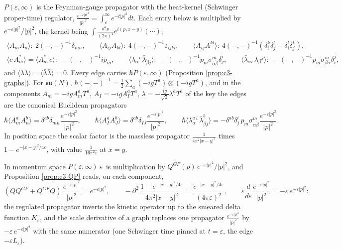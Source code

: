 \begin{remark}
$P(\varepsilon,\infty)$ is the Feynman-gauge propagator with the heat-kernel (Schwinger proper-time) regulator, $\frac{e^{-\varepsilon|p|^2}}{|p|^2}=\int_\varepsilon^\infty e^{-t|p|^2}dt$. Each entry below is multiplied by $e^{-\varepsilon|p|^2}/|p|^2$, the kernel being $\int\frac{d^4p}{(2\pi)^4}e^{i(p,x-y)}(\cdots)$:
\[
\begin{gathered}
\langle A_mA_n\rangle:\ 2(-,-)^{-1}\delta_{mn},\qquad \langle A_{ij}A_{kl}\rangle:\ 4(-,-)^{-1}\varepsilon_{ijkl},\qquad \langle A_{ij}A^{kl}\rangle:\ 4(-,-)^{-1}(\delta_i^k\delta_j^l-\delta_i^l\delta_j^k),\\
\langle c\,A^*_m\rangle=\langle A^*_m\,c\rangle:\ -(-,-)^{-1}ip_m,\qquad \langle\lambda_\alpha{}^i\,\bar\lambda_{\dot\beta j}\rangle:\ -(-,-)^{-1}p_m\sigma^m_{\alpha\dot\beta}\delta^i_j,\qquad \langle\bar\lambda_{\dot\alpha i}\,\lambda_\beta{}^j\rangle:\ -(-,-)^{-1}p_m\sigma^m_{\beta\dot\alpha}\delta_i^j,
\end{gathered}
\]
and $\langle\lambda\lambda\rangle=\langle\bar\lambda\bar\lambda\rangle=0$. Every edge carries $\hbar P(\varepsilon,\infty)$ (Proposition \ref{prop:c3-graphs}). For $\mathfrak{su}(N)$, $\hbar(-,-)^{-1}=\tfrac12\sum_a(-igT^a)\otimes(-igT^a)$, and in the components $A_m=-igA^a_mT^a$, $A_I=-igA^a_IT^a$, $\lambda=-\tfrac{ig}{\sqrt2}\lambda^aT^a$ of the key the edges are the canonical Euclidean propagators
\[
\hbar\langle A^a_mA^b_n\rangle=\delta^{ab}\delta_{mn}\frac{e^{-\varepsilon|p|^2}}{|p|^2},\qquad \hbar\langle A^a_IA^b_J\rangle=\delta^{ab}\delta_{IJ}\frac{e^{-\varepsilon|p|^2}}{|p|^2},\qquad \hbar\langle\lambda^a_\alpha{}^i\,\bar\lambda^b_{\dot\beta j}\rangle=-\delta^{ab}\delta^i_j\,p_m\sigma^m_{\alpha\dot\beta}\frac{e^{-\varepsilon|p|^2}}{|p|^2}.
\]
In position space the scalar factor is the massless propagator $\frac1{4\pi^2|x-y|^2}$ times $1-e^{-|x-y|^2/4\varepsilon}$, with value $\frac1{16\pi^2\varepsilon}$ at $x=y$.
\end{remark}

\begin{remark}[Physics notation: the two kernels at $t=\varepsilon$]
In momentum space $P(\varepsilon,\infty)\star$ is multiplication by $Q^{GF}(p)\,e^{-\varepsilon|p|^2}/|p|^2$, and Proposition \ref{prop:c3-QP} reads, on each component,
\[
(QQ^{GF}+Q^{GF}Q)\,\frac{e^{-\varepsilon|p|^2}}{|p|^2}=e^{-\varepsilon|p|^2},\qquad -\partial^2\,\frac{1-e^{-|x-y|^2/4\varepsilon}}{4\pi^2|x-y|^2}=\frac{e^{-|x-y|^2/4\varepsilon}}{(4\pi\varepsilon)^2},\qquad \varepsilon\frac{d}{d\varepsilon}\frac{e^{-\varepsilon|p|^2}}{|p|^2}=-\varepsilon\,e^{-\varepsilon|p|^2}:
\]
the regulated propagator inverts the kinetic operator up to the smeared delta function $K_\varepsilon$, and the scale derivative of a graph replaces one propagator $\frac{e^{-\varepsilon|p|^2}}{|p|^2}$ by $-\varepsilon\,e^{-\varepsilon|p|^2}$ with the same numerator (one Schwinger time pinned at $t=\varepsilon$, the edge $-\varepsilon L_\varepsilon$).
\end{remark}

